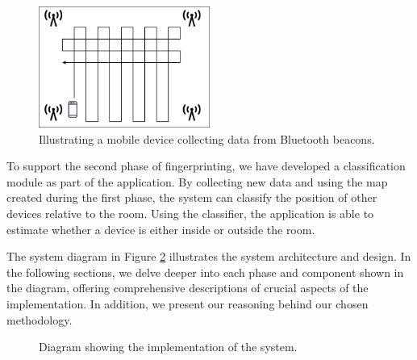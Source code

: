 \begin{figure}[H]
    \centering
    \includegraphics[width=0.5\textwidth]{images/CreateMap.drawio.png}
    \caption{Illustrating a mobile device collecting data from Bluetooth beacons.}
    \label{fig:CreateMap}
\end{figure}

To support the second phase of fingerprinting, we have developed a classification module as part of the application. 
By collecting new data and using the map created during the first phase, the system can classify the position of other devices relative to the room. 
Using the classifier, the application is able to estimate whether a device is either inside or outside the room.

The system diagram in Figure \ref{fig:implementation_diagram} illustrates the system architecture and design.
In the following sections, we delve deeper into each phase and component shown in the diagram, offering comprehensive descriptions of crucial aspects of the implementation.
In addition, we present our reasoning behind our chosen methodology.

\begin{figure}[H]
  \centering
  \caption{Diagram showing the implementation of the system.}
  \label{fig:implementation_diagram}
\end{figure}